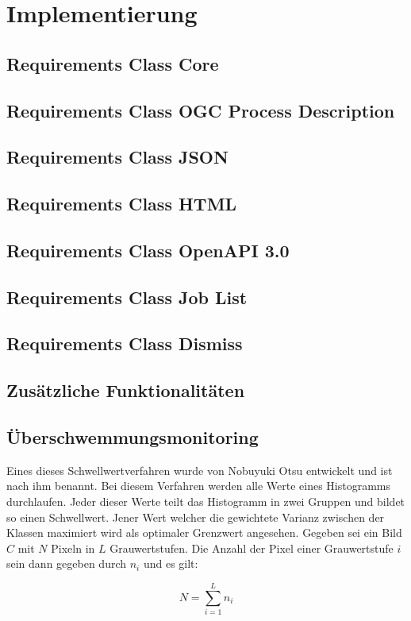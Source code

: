 \newpage
\restoregeometry
\section{Implementierung}
\subsection{Requirements Class Core}
\subsection{Requirements Class OGC Process Description}
\subsection{Requirements Class JSON}
\subsection{Requirements Class HTML}
\subsection{Requirements Class OpenAPI 3.0}
\subsection{Requirements Class Job List}
\subsection{Requirements Class Dismiss}
\subsection{Zusätzliche Funktionalitäten}
\subsection{Überschwemmungsmonitoring}
Eines dieses Schwellwertverfahren wurde von Nobuyuki Otsu entwickelt und ist nach ihm benannt. Bei diesem Verfahren werden alle Werte eines Histogramms durchlaufen.
Jeder dieser Werte teilt das Histogramm in zwei Gruppen und bildet so einen Schwellwert. Jener Wert welcher die gewichtete Varianz zwischen der Klassen maximiert wird
als optimaler Grenzwert angesehen.
Gegeben sei ein Bild $C$ mit $N$ Pixeln in $L$ Grauwertstufen. Die Anzahl der Pixel einer Grauwertstufe $i$ sein dann gegeben durch $n_i$ und es gilt:

\begin{equation}
    N = \sum_{i=1}^{L} n_i
\end{equation}

